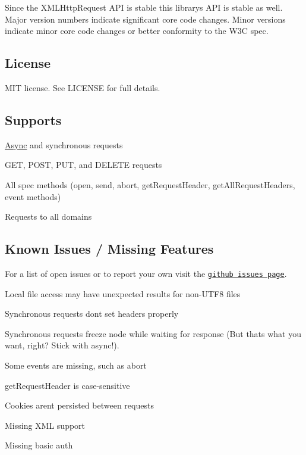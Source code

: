 Since the X\+M\+L\+Http\+Request A\+PI is stable this library\textquotesingle{}s A\+PI is stable as well. Major version numbers indicate significant core code changes. Minor versions indicate minor core code changes or better conformity to the W3C spec.

\subsection*{License}

M\+IT license. See L\+I\+C\+E\+N\+SE for full details.

\subsection*{Supports}


\begin{DoxyItemize}
\item \mbox{\hyperlink{struct_async}{Async}} and synchronous requests
\item G\+ET, P\+O\+ST, P\+UT, and D\+E\+L\+E\+TE requests
\item All spec methods (open, send, abort, get\+Request\+Header, get\+All\+Request\+Headers, event methods)
\item Requests to all domains
\end{DoxyItemize}

\subsection*{Known Issues / Missing Features}

For a list of open issues or to report your own visit the \href{https://github.com/driverdan/node-XMLHttpRequest/issues}{\tt github issues page}.


\begin{DoxyItemize}
\item Local file access may have unexpected results for non-\/\+U\+T\+F8 files
\item Synchronous requests don\textquotesingle{}t set headers properly
\item Synchronous requests freeze node while waiting for response (But that\textquotesingle{}s what you want, right? Stick with async!).
\item Some events are missing, such as abort
\item get\+Request\+Header is case-\/sensitive
\item Cookies aren\textquotesingle{}t persisted between requests
\item Missing X\+ML support
\item Missing basic auth 
\end{DoxyItemize}